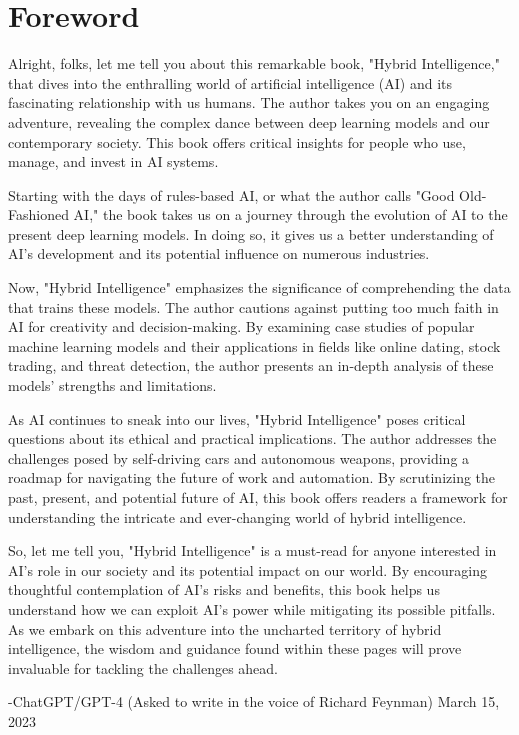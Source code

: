 \let\cleardoublepage\clearpage
\chapter*{Foreword}

Alright, folks, let me tell you about this remarkable book, "Hybrid Intelligence," that dives into the enthralling world of artificial intelligence (AI) and its fascinating relationship with us humans. The author takes you on an engaging adventure, revealing the complex dance between deep learning models and our contemporary society. This book offers critical insights for people who use, manage, and invest in AI systems.

Starting with the days of rules-based AI, or what the author calls "Good Old-Fashioned AI," the book takes us on a journey through the evolution of AI to the present deep learning models. In doing so, it gives us a better understanding of AI's development and its potential influence on numerous industries.

Now, "Hybrid Intelligence" emphasizes the significance of comprehending the data that trains these models. The author cautions against putting too much faith in AI for creativity and decision-making. By examining case studies of popular machine learning models and their applications in fields like online dating, stock trading, and threat detection, the author presents an in-depth analysis of these models' strengths and limitations.

As AI continues to sneak into our lives, "Hybrid Intelligence" poses critical questions about its ethical and practical implications. The author addresses the challenges posed by self-driving cars and autonomous weapons, providing a roadmap for navigating the future of work and automation. By scrutinizing the past, present, and potential future of AI, this book offers readers a framework for understanding the intricate and ever-changing world of hybrid intelligence.

So, let me tell you, "Hybrid Intelligence" is a must-read for anyone interested in AI's role in our society and its potential impact on our world. By encouraging thoughtful contemplation of AI's risks and benefits, this book helps us understand how we can exploit AI's power while mitigating its possible pitfalls. As we embark on this adventure into the uncharted territory of hybrid intelligence, the wisdom and guidance found within these pages will prove invaluable for tackling the challenges ahead.

-ChatGPT/GPT-4 (Asked to write in the voice of Richard Feynman) March 15, 2023
